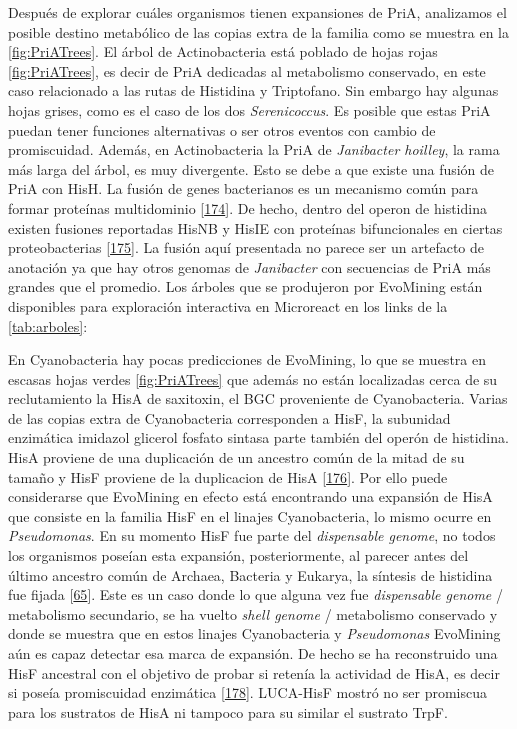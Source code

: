 \documentclass[12pt,twoside]{reedthesis}
\begin{document}
  Después de explorar cuáles organismos tienen expansiones de PriA,
  analizamos el posible destino metabólico de las copias extra de la
  familia como se muestra en la \autoref{fig:PriATrees}. El árbol de
  Actinobacteria está poblado de hojas rojas \autoref{fig:PriATrees}, es
  decir de PriA dedicadas al metabolismo conservado, en este caso
  relacionado a las rutas de Histidina y Triptofano. Sin embargo hay
  algunas hojas grises, como es el caso de los dos \emph{Serenicoccus}. Es
  posible que estas PriA puedan tener funciones alternativas o ser otros
  eventos con cambio de promiscuidad. Además, en Actinobacteria la PriA de
  \emph{Janibacter hoilley}, la rama más larga del árbol, es muy
  divergente. Esto se debe a que existe una fusión de PriA con HisH. La
  fusión de genes bacterianos es un mecanismo común para formar proteínas
  multidominio {[}\protect\hyperlink{ref-pasek_gene_2006}{174}{]}. De
  hecho, dentro del operon de histidina existen fusiones reportadas HisNB
  y HisIE con proteínas bifuncionales en ciertas proteobacterias
  {[}\protect\hyperlink{ref-fani_origin_2005}{175}{]}. La fusión aquí
  presentada no parece ser un artefacto de anotación ya que hay otros
  genomas de \emph{Janibacter} con secuencias de PriA más grandes que el
  promedio. Los árboles que se produjeron por EvoMining están disponibles
  para exploración interactiva en Microreact en los links de la
  \autoref{tab:arboles}:
  
  En Cyanobacteria hay pocas predicciones de EvoMining, lo que se muestra
  en escasas hojas verdes \autoref{fig:PriATrees} que además no están
  localizadas cerca de su reclutamiento la HisA de saxitoxin, el BGC
  proveniente de Cyanobacteria. Varias de las copias extra de
  Cyanobacteria corresponden a HisF, la subunidad enzimática imidazol
  glicerol fosfato sintasa parte también del operón de histidina. HisA
  proviene de una duplicación de un ancestro común de la mitad de su
  tamaño y HisF proviene de la duplicacion de HisA
  {[}\protect\hyperlink{ref-fani_evolution_1994}{176}{]}. Por ello puede
  considerarse que EvoMining en efecto está encontrando una expansión de
  HisA que consiste en la familia HisF en el linajes Cyanobacteria, lo
  mismo ocurre en \emph{Pseudomonas}. En su momento HisF fue parte del
  \emph{dispensable genome}, no todos los organismos poseían esta
  expansión, posteriormente, al parecer antes del último ancestro común de
  Archaea, Bacteria y Eukarya, la síntesis de histidina fue fijada
  {[}\protect\hyperlink{ref-fondi_evolution_2009}{65}{]}. Este es un caso
  donde lo que alguna vez fue \emph{dispensable genome} / metabolismo
  secundario, se ha vuelto \emph{shell genome} / metabolismo conservado y
  donde se muestra que en estos linajes Cyanobacteria y \emph{Pseudomonas}
  EvoMining aún es capaz detectar esa marca de expansión. De hecho se ha
  reconstruido una HisF ancestral con el objetivo de probar si retenía la
  actividad de HisA, es decir si poseía promiscuidad enzimática
  {[}\protect\hyperlink{ref-merkl_reconstruction_2016}{178}{]}. LUCA-HisF
  mostró no ser promiscua para los sustratos de HisA ni tampoco para su
  similar el sustrato TrpF.
  
\end{document}
